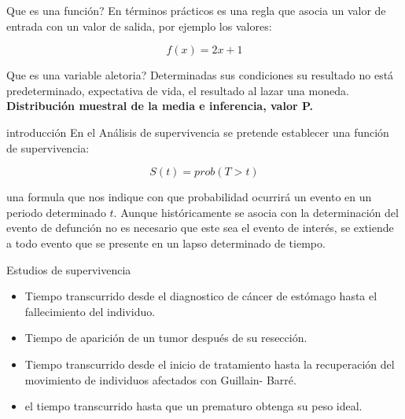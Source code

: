 \documentclass{beamer}
\begin{document}
\begin{frame}{Que es una función?}
En términos prácticos es una regla que asocia un valor de entrada con un valor de salida, por ejemplo los valores:

\begin{equation}
f(x) = 2x+1
\end{equation}


\end{frame}


\begin{frame}{Que es una variable aletoria?}
Determinadas sus condiciones su resultado no está predeterminado, expectativa de vida, el resultado al lazar una moneda.
\textbf{Distribución muestral de la media e inferencia, valor P.}
\end{frame}





\begin{frame}{introducción}
En el Análisis de supervivencia se pretende establecer una función de supervivencia:
 
$$S(t) = prob(T>t)$$

una formula que nos indique con que probabilidad ocurrirá un evento en un periodo determinado $t$. Aunque históricamente se asocia con la determinación del evento de defunción no es necesario que este sea el evento de interés, se extiende a todo evento que se presente en un lapso determinado de tiempo.

\end{frame}






\begin{frame}{Estudios de supervivencia}


\begin{itemize}

\item Tiempo transcurrido desde el diagnostico   de cáncer de estómago hasta el fallecimiento del individuo.

\item Tiempo de aparición de un tumor después de su resección. 


\item Tiempo transcurrido desde el inicio de tratamiento hasta la recuperación del movimiento de individuos afectados con Guillain- Barré.

\item el tiempo transcurrido hasta que un prematuro  obtenga su peso ideal.

\end{itemize}

\end{frame}
\end{document}
